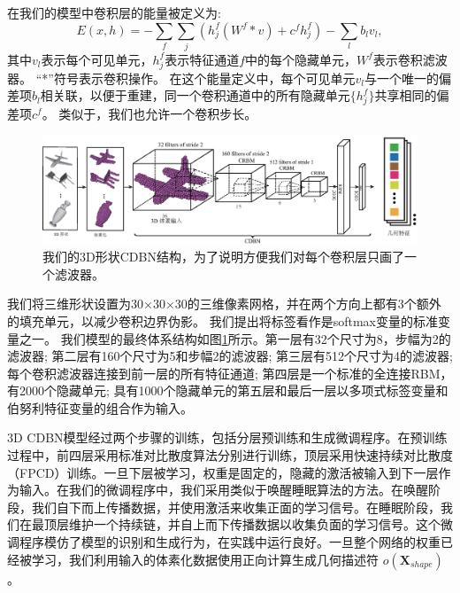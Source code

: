 在我们的模型中卷积层的能量被定义为:
%
\begin{equation}
 E(x,h) = - \sum_{f} \sum_{j} \left( h^f_j \left( W^f * v \right) + c^f h^f_j \right) - \sum_{l} b_l v_l ,
\end{equation}
%
其中$ v_l $表示每个可见单元，$ h ^ f_j $表示特征通道$ f $中的每个隐藏单元，$ W ^ f $表示卷积滤波器。 “*”符号表示卷积操作。 在这个能量定义中，每个可见单元$ v_l $与一个唯一的偏差项$ b_l $相关联，以便于重建，同一个卷积通道中的所有隐藏单元$\{h^f_j\}$共享相同的偏差项$ c^f $。 类似于\cite{krizhevsky2012imagenet}，我们也允许一个卷积步长。

\begin{figure} [htbp]
\begin{center}
\includegraphics[width=0.98\linewidth]{figures/3d_cdbn}
\end{center} 
\vspace{-4mm}
\caption{我们的3D形状CDBN结构，为了说明方便我们对每个卷积层只画了一个滤波器。}
\label{fig_CDBN_shape}
\end{figure}


我们将三维形状设置为30×30×30的三维像素网格，并在两个方向上都有3个额外的填充单元，以减少卷积边界伪影。 我们提出将标签看作是softmax变量的标准变量之一。 我们模型的最终体系结构如图\ref{fig_CDBN_shape}所示。第一层有32个尺寸为8，步幅为2的滤波器; 第二层有160个尺寸为5和步幅2的滤波器; 第三层有512个尺寸为4的滤波器; 每个卷积滤波器连接到前一层的所有特征通道; 第四层是一个标准的全连接RBM，有2000个隐藏单元; 具有1000个隐藏单元的第五层和最后一层以多项式标签变量和伯努利特征变量的组合作为输入。

3D CDBN模型经过两个步骤的训练，包括分层预训练和生成微调程序。在预训练过程中，前四层采用标准对比散度算法\cite{Hinton2002Training}分别进行训练，顶层采用快速持续对比散度（FPCD）训练\cite{Tieleman2009Using}。一旦下层被学习，权重是固定的，隐藏的激活被输入到下一层作为输入。在我们的微调程序中，我们采用类似于唤醒睡眠算法的方法\cite{Hinton2006A}。在唤醒阶段，我们自下而上传播数据，并使用激活来收集正面的学习信号。在睡眠阶段，我们在最顶层维护一个持续链，并自上而下传播数据以收集负面的学习信号。这个微调程序模仿了模型的识别和生成行为，在实践中运行良好。一旦整个网络的权重已经被学习，我们利用输入的体素化数据使用正向计算生成几何描述符 $o(\mathbf{X}_{shape})$。



